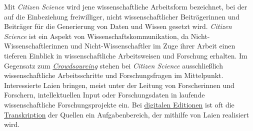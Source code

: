 \documentclass{article}
\begin{document}
    Mit \emph{Citizen Science} wird jene wissenschaftliche Arbeitsform bezeichnet, bei der auf die Einbeziehung freiwilliger, nicht wissenschaftlicher Beiträgerinnen und Beiträger für die Generierung von Daten und Wissen gesetzt wird. \emph{Citizen Science} ist ein Aspekt von Wissenschaftskommunikation, da Nicht-Wissenschaftlerinnen und Nicht-Wissenschaftler im Zuge ihrer Arbeit einen tieferen Einblick in wissenschaftliche Arbeitsweisen und Forschung erhalten. Im Gegensatz zum \emph{\href{http://gams.uni-graz.at/o:konde.47}{Crowdsourcing}} stehen bei \emph{Citizen Science} ausschließlich wissenschaftliche Arbeitsschritte und Forschungsfragen im Mittelpunkt. Interessierte Laien bringen, meist unter der Leitung von Forscherinnen und Forschern, intellektuellen Input oder Forschungsdaten in laufende wissenschaftliche Forschungsprojekte ein. Bei \href{http://gams.uni-graz.at/o:konde.59}{digitalen Editionen} ist oft die \href{http://gams.uni-graz.at/o:konde.197}{Transkription} der Quellen ein Aufgabenbereich, der mithilfe von Laien realisiert wird. \\
            
\end{document}
